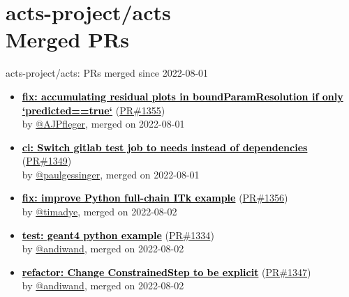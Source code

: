 





\section{ acts-project/acts \\ Merged PRs}
\begin{frame}[allowframebreaks]{ acts-project/acts: PRs merged since 2022-08-01 }

  \begin{itemize}
    
    \item
    \textbf{\href{https://github.com/acts-project/acts/pull/1355}{\textcolor{black}{fix: accumulating residual plots in boundParamResolution if only `predicted==true`}}}
    (\href{https://github.com/acts-project/acts/pull/1355}{PR\#1355}) \\
    by \href{https://github.com/AJPfleger}{ @AJPfleger}, merged on 2022-08-01

    \item
    \textbf{\href{https://github.com/acts-project/acts/pull/1349}{\textcolor{black}{ci: Switch gitlab test job to needs instead of dependencies}}}
    (\href{https://github.com/acts-project/acts/pull/1349}{PR\#1349}) \\
    by \href{https://github.com/paulgessinger}{ @paulgessinger}, merged on 2022-08-01

    \item
    \textbf{\href{https://github.com/acts-project/acts/pull/1356}{\textcolor{black}{fix: improve Python full-chain ITk example}}}
    (\href{https://github.com/acts-project/acts/pull/1356}{PR\#1356}) \\
    by \href{https://github.com/timadye}{ @timadye}, merged on 2022-08-02

    \item
    \textbf{\href{https://github.com/acts-project/acts/pull/1334}{\textcolor{black}{test: geant4 python example}}}
    (\href{https://github.com/acts-project/acts/pull/1334}{PR\#1334}) \\
    by \href{https://github.com/andiwand}{ @andiwand}, merged on 2022-08-02

    \item
    \textbf{\href{https://github.com/acts-project/acts/pull/1347}{\textcolor{black}{refactor: Change ConstrainedStep to be explicit}}}
    (\href{https://github.com/acts-project/acts/pull/1347}{PR\#1347}) \\
    by \href{https://github.com/andiwand}{ @andiwand}, merged on 2022-08-02


\end{itemize}
\end{frame}
